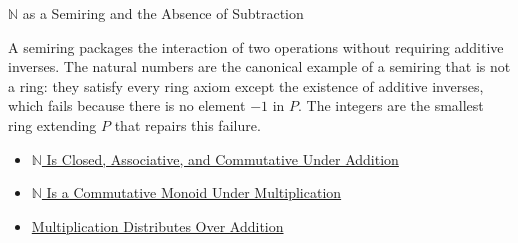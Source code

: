 \begin{topicbox}{$\mathbb{N}$ as a Semiring and the Absence of Subtraction}
\begin{remark*}[Interpretation]
A semiring packages the interaction of two operations without requiring
additive inverses. The natural numbers are the canonical example of a semiring
that is not a ring: they satisfy every ring axiom except the existence of
additive inverses, which fails because there is no element $-1$ in $P$.
The integers are the smallest ring extending $P$ that repairs this failure.
\end{remark*}

\begin{dependencies}
\begin{itemize}
  \item \hyperref[thm:n-additive-structure]{$\mathbb{N}$ Is Closed, Associative, and Commutative Under Addition}
  \item \hyperref[thm:n-multiplicative-monoid]{$\mathbb{N}$ Is a Commutative Monoid Under Multiplication}
  \item \hyperref[thm:multiplication-distributes-over-addition]{Multiplication Distributes Over Addition}
\end{itemize}
\end{dependencies}
\end{topicbox}
